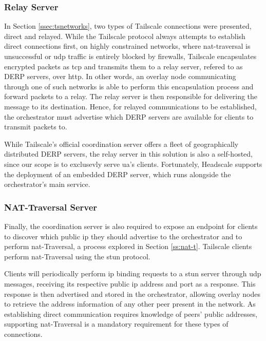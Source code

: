 \documentclass[11pt,twoside,a4paper]{report}
\begin{document}
\subsubsection{Relay Server}

In Section \ref{ssec:tsnetworks}, two types of Tailscale connections were presented, direct and relayed. While the Tailscale protocol always attempts to establish direct connections first, on highly constrained networks, where \ac{nat}-traversal is unsuccessful or \ac{udp} traffic is entirely blocked by firewalls, Tailscale encapsulates encrypted packets as \ac{tcp} and transmits them to a relay server, refered to as \ac{DERP} servers, over \ac{http}. In other words, an overlay node communicating through one of such networks is able to perform this encapsulation process and forward packets to a relay. The relay server is then responsible for delivering the message to its destination. Hence, for relayed communications to be established, the orchestrator must advertise which \ac{DERP} servers are available for clients to transmit packets to.

While Tailscale's official coordination server offers a fleet of geographically distributed \ac{DERP} servers, the relay server in this solution is also a self-hosted, since our scope is to exclusevly serve \ac{ua}'s clients. Fortunately, Headscale supports the deployment of an embedded \ac{DERP} server, which runs alongside the orchestrator's main service.

\subsubsection{NAT-Traversal Server}

Finally, the coordination server is also required to expose an endpoint for clients to discover which public \ac{ip} they should advertise to the orchestrator and to perform \ac{nat}-Traversal, a  process explored in Section \ref{ss:nat-t}. Tailscale clients perform \ac{nat}-Traversal using the \ac{stun} protocol.

Clients will periodically perform \ac{ip} binding requests to a \ac{stun} server through \ac{udp} messages, receiving its respective public \ac{ip} address and port as a response. This response is then advertised and stored in the orchestrator, allowing overlay nodes to retrieve the address information of any other peer present in the network. As establishing direct communication requires knowledge of peers' public addresses, supporting \ac{nat}-Traversal is a mandatory requirement for these types of connections.
\end{document}
